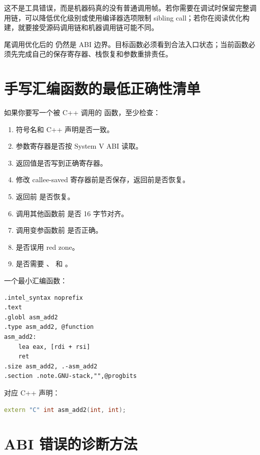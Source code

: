 这不是工具错误，而是机器码真的没有普通调用帧。若你需要在调试时保留完整调用链，可以降低优化级别或使用编译器选项限制 sibling call；若你在阅读优化构建，就要接受源码调用链和机器调用链可能不同。

\begin{warningbox}
尾调用优化后的  仍然是 ABI 边界。目标函数必须看到合法入口状态；当前函数必须先完成自己的保存寄存器、栈恢复和参数重排责任。
\end{warningbox}

\section{手写汇编函数的最低正确性清单}

如果你要写一个被 C++ 调用的  函数，至少检查：

\begin{enumerate}
  \item 符号名和 C++ 声明是否一致。
  \item 参数寄存器是否按 System V ABI 读取。
  \item 返回值是否写到正确寄存器。
  \item 修改 callee-saved 寄存器前是否保存，返回前是否恢复。
  \item 返回前  是否恢复。
  \item 调用其他函数前  是否 16 字节对齐。
  \item 调用变参函数前  是否正确。
  \item 是否误用 red zone。
  \item 是否需要 、 和 。
\end{enumerate}

一个最小汇编函数：

\begin{lstlisting}
.intel_syntax noprefix
.text
.globl asm_add2
.type asm_add2, @function
asm_add2:
    lea eax, [rdi + rsi]
    ret
.size asm_add2, .-asm_add2
.section .note.GNU-stack,"",@progbits
\end{lstlisting}

对应 C++ 声明：

\begin{lstlisting}[language=C++]
extern "C" int asm_add2(int, int);
\end{lstlisting}

\section{ABI 错误的诊断方法}


